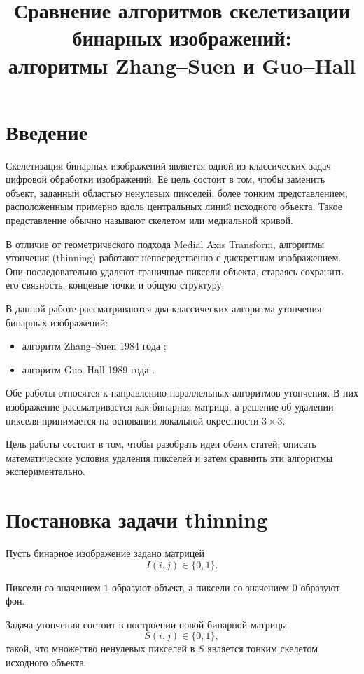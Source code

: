 \documentclass[12pt,a4paper]{article}
\title{
	Сравнение алгоритмов скелетизации бинарных изображений:\\
	алгоритмы Zhang--Suen и Guo--Hall
}
\author{}
\date{}
\begin{document}
	
	\maketitle
	
	\section{Введение}
	
	Скелетизация бинарных изображений является одной из классических задач цифровой обработки изображений. Ее цель состоит в том, чтобы заменить объект, заданный областью ненулевых пикселей, более тонким представлением, расположенным примерно вдоль центральных линий исходного объекта. Такое представление обычно называют скелетом или медиальной кривой.
	
	В отличие от геометрического подхода Medial Axis Transform, алгоритмы утончения (thinning) работают непосредственно с дискретным изображением. Они последовательно удаляют граничные пиксели объекта, стараясь сохранить его связность, концевые точки и общую структуру.
	
	В данной работе рассматриваются два классических алгоритма утончения бинарных изображений:
	
	\begin{itemize}
		\item алгоритм Zhang--Suen 1984 года \cite{zhang1984};
		\item алгоритм Guo--Hall 1989 года \cite{guo1989}.
	\end{itemize}
	
	Обе работы относятся к направлению параллельных алгоритмов утончения. В них изображение рассматривается как бинарная матрица, а решение об удалении пикселя принимается на основании локальной окрестности $3\times3$.
	
	Цель работы состоит в том, чтобы разобрать идеи обеих статей, описать математические условия удаления пикселей и затем сравнить эти алгоритмы экспериментально.
	
	\section{Постановка задачи thinning}
	
	Пусть бинарное изображение задано матрицей
	\[
	I(i,j) \in \{0,1\}.
	\]
	
	Пиксели со значением $1$ образуют объект, а пиксели со значением $0$ образуют фон.
	
	Задача утончения состоит в построении новой бинарной матрицы
	\[
	S(i,j) \in \{0,1\},
	\]
	такой, что множество ненулевых пикселей в $S$ является тонким скелетом исходного объекта.
	
\end{document}
